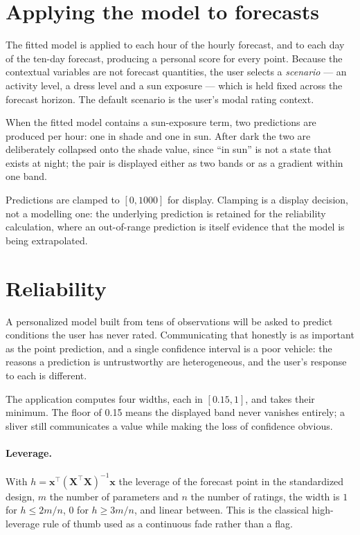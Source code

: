 \documentclass[11pt]{article}
\begin{document}
\section{Applying the model to forecasts}
\label{sec:forecast}

The fitted model is applied to each hour of the hourly forecast, and to each
day of the ten-day forecast, producing a personal score for every point.
Because the contextual variables are not forecast quantities, the user selects
a \emph{scenario} --- an activity level, a dress level and a sun exposure ---
which is held fixed across the forecast horizon. The default scenario is the
user's modal rating context.

When the fitted model contains a sun-exposure term, two predictions are
produced per hour: one in shade and one in sun. After dark the two are
deliberately collapsed onto the shade value, since ``in sun'' is not a state
that exists at night; the pair is displayed either as two bands or as a
gradient within one band.

Predictions are clamped to $[0, 1000]$ for display. Clamping is a display
decision, not a modelling one: the underlying prediction is retained for the
reliability calculation, where an out-of-range prediction is itself evidence
that the model is being extrapolated.

\section{Reliability}
\label{sec:reliability}

A personalized model built from tens of observations will be asked to predict
conditions the user has never rated. Communicating that honestly is as
important as the point prediction, and a single confidence interval is a poor
vehicle: the reasons a prediction is untrustworthy are heterogeneous, and the
user's response to each is different.

The application computes four widths, each in $[0.15, 1]$, and takes their
minimum. The floor of 0.15 means the displayed band never vanishes entirely; a
sliver still communicates a value while making the loss of confidence obvious.

\paragraph{Leverage.} With $h = \mathbf{x}^\top(\mathbf{X}^\top\mathbf{X})^{-1}
\mathbf{x}$ the leverage of the forecast point in the standardized design,
$m$ the number of parameters and $n$ the number of ratings, the width is $1$
for $h \leq 2m/n$, $0$ for $h \geq 3m/n$, and linear between. This is the
classical high-leverage rule of thumb used as a continuous fade rather than a
flag.
\end{document}
